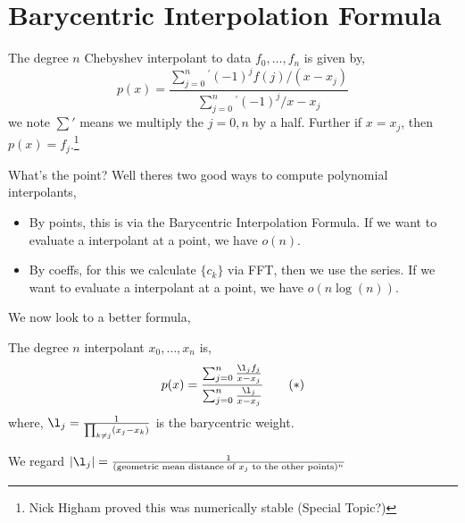 
\section{Barycentric Interpolation Formula}
\begin{nthm}
  The degree $n$ Chebyshev interpolant to data $f_0, \dots, f_n$ is given by,
  $$ p(x) = \frac{\sum_{j = 0}^n {}^{'} (-1)^j f(j) / (x - x_j)}{\sum_{j=0}^n{}^{'} (-1)^j / x - x_j} $$
  we note $\sum'$ means we multiply the $j = 0, n$ by a half. Further if $x = x_j$, then $p(x) = f_j$.\footnote{Nick Higham proved this was numerically stable (Special Topic?)}
\end{nthm}

What's the point? Well theres two good ways to compute polynomial interpolants,
\begin{itemize}
  \item By points, this is via the Barycentric Interpolation Formula. If we want to evaluate a interpolant at a point, we have $o(n)$.
  \item By coeffs, for this we calculate $\{c_k\}$ via FFT, then we use the series. If we want to evaluate a interpolant at a point, we have $o(n\log (n))$.
\end{itemize}

\noindent
We now look to a better formula,
\begin{nthm}
  The degree $n$ interpolant $x_0, \dots, x_n$ is,
  \begin{equation}
    p(x) = \frac{\sum_{j=0}^n \frac{\l_j f_j}{x - x_j}}{\sum_{j=0}^n \frac{\l_j}{x - x_j}} \tag{$*$}\label{eq:iF}
  \end{equation}
  where, $\l_j = \frac{1}{\prod_{k \ne j} (x_j - x_k)}$ is the barycentric weight.
\end{nthm}

\begin{note}
  We regard $|\l_j| = \frac{1}{(\text{geometric mean distance of $x_j$ to the other points})^n}$
\end{note}

